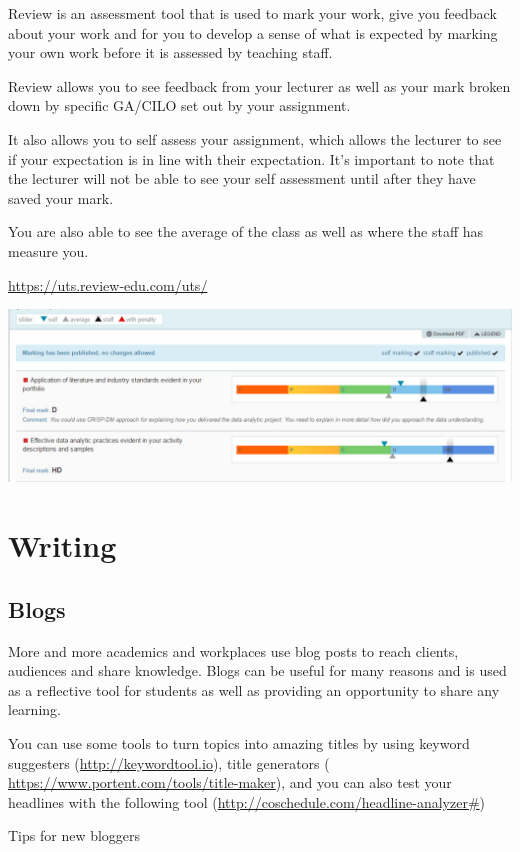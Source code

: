 \documentclass[]{book}
\theoremstyle{definition}
\theoremstyle{definition}
\theoremstyle{remark}
\begin{document}
Review is an assessment tool that is used to mark your work, give you
feedback about your work and for you to develop a sense of what is
expected by marking your own work before it is assessed by teaching
staff.

Review allows you to see feedback from your lecturer as well as your
mark broken down by specific GA/CILO set out by your assignment.

It also allows you to self assess your assignment, which allows the
lecturer to see if your expectation is in line with their expectation.
It's important to note that the lecturer will not be able to see your
self assessment until after they have saved your mark.

You are also able to see the average of the class as well as where the
staff has measure you.

\url{https://uts.review-edu.com/uts/}

\includegraphics{images/Reviews.jpg}

\section{Writing}\label{writing}

\subsection{Blogs}\label{blogs}

More and more academics and workplaces use blog posts to reach clients,
audiences and share knowledge. Blogs can be useful for many reasons and
is used as a reflective tool for students as well as providing an
opportunity to share any learning.

You can use some tools to turn topics into amazing titles by using
keyword suggesters (\url{http://keywordtool.io}), title generators (
\url{https://www.portent.com/tools/title-maker}), and you can also test
your headlines with the following tool
(\url{http://coschedule.com/headline-analyzer\#})

Tips for new bloggers
\end{document}
